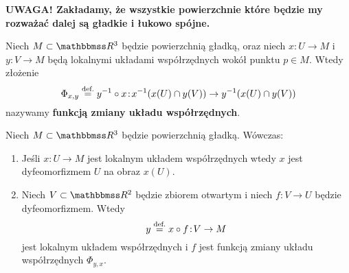 \begin{frame}[<+->]

\begin{uwaga}
\textbf{UWAGA! Zakładamy, że wszystkie powierzchnie które będzie my rozważać dalej są gładkie i łukowo spójne.}
\end{uwaga}

\end{frame}
\begin{frame}[<+->]

\begin{definicja}
Niech $M\subset\R^3$ będzie powierzchnią gładką, oraz niech $x\colon U\to M$ i $y\colon V\to M$ będą lokalnymi układami współrzędnych wokół punktu $p\in M$. Wtedy złożenie \[\Phi_{x,y}\define y^{-1}\circ x\colon x^{-1}(x(U)\cap y(V))\to y^{-1}(x(U)\cap y(V))\]
nazywamy \textbf{funkcją zmiany układu współrzędnych}.

\end{definicja}
\end{frame}
\begin{frame}[<+->]
\begin{center}

\end{center}

\end{frame}
\begin{frame}


\begin{lemat}\label{lem:chart_loc_bij}
Niech $M\subset \R^3$ będzie powierzchnią gładką. Wówczas:
\begin{enumerate}[<+->]
\item Jeśli $x\colon U\to M$ jest lokalnym układem współrzędnych wtedy $x$ jest dyfeomorfizmem $U$ na obraz $x(U)$. %
\item Niech $V\subset \R^2$ będzie zbiorem otwartym i niech $f\colon V\to U$ będzie dyfeomorfizmem. Wtedy \[y\define x\circ f\colon V\to M\] jest lokalnym układem współrzędnych i $f$ jest funkcją zmiany układu współrzędnych $\Phi_{y,x}$.
\end{enumerate}
\end{lemat}

\end{frame}

